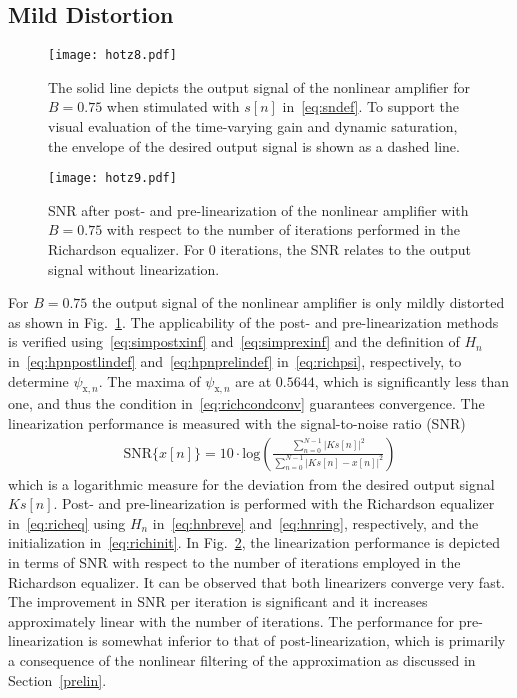 \documentclass[10pt,twocolumn,twoside]{IEEEtran}
\renewcommand{\log}[1]{\ensuremath{\text{log}\!\left(#1\right)}}		\newcommand{\abs}[1]{\ensuremath{\lvert#1\rvert}}										\newcommand{\norm}[1]{\ensuremath{\lVert#1\rVert}}									\newcommand{\norminf}[1]{\ensuremath{\lVert#1\rVert_\infty}}				\newcommand{\normone}[1]{\ensuremath{\lVert#1\rVert_1}}							\newcommand{\vm}[1]{\ensuremath{\bm{\mathrm{#1}}}}									\newcommand{\mc}[1]{\ensuremath{\mathcal{#1}}}											\newcommand{\trans}{\ensuremath{\mathsf{T}}}												\newcommand{\Z}{\ensuremath{\mathds{Z}}}														\newcommand{\C}{\ensuremath{\mathbb{C}}}														\newcommand{\sg}[2]{\ensuremath{g_{\mathrm{#1},#2}}}								\newcommand{\sw}[1]{\ensuremath{w_{\mathrm{#1}}}}										\newcommand{\swtilde}[1]{\ensuremath{\tilde{w}_{\mathrm{#1}}}}			\newcommand{\spsi}[2]{\ensuremath{\psi_{\mathrm{#1},#2}}}						\newcommand{\seta}[2]{\ensuremath{\eta_{\mathrm{#1},#2}}}						\newcommand{\setatilde}[2]{\ensuremath{\tilde{\eta}_{\mathrm{#1},#2}}}   \newcommand{\salpha}[2]{\ensuremath{\alpha_{\mathrm{#1},#2}}}				\newcommand{\sbeta}[2]{\ensuremath{\beta_{\mathrm{#1},#2}}}					\newcommand{\sgamma}[2]{\ensuremath{\gamma_{\mathrm{#1},#2}}}
\begin{document}
\subsection{Mild Distortion}
	\label{results:mild}

\begin{figure}[!t]\centering \texttt{[image: hotz8.pdf]}\caption{The solid line depicts the output signal of the nonlinear
	amplifier for $B=0.75$ when stimulated with $s[n]$ in~\eqref{eq:sndef}. To support the
	visual evaluation of the time-varying gain and dynamic saturation,
	the envelope of the desired output signal is shown as a dashed line.}\label{fig:inoutcmpb075}\end{figure}\begin{figure}[!t]\centering \texttt{[image: hotz9.pdf]}\caption{SNR after post- and pre-linearization of the nonlinear amplifier with $B=0.75$
	with respect to the number of iterations performed in the Richardson equalizer.
	For $0$ iterations, the SNR relates to the output signal without linearization.}\label{fig:snrb075}\end{figure}


For $B=0.75$ the output signal of the nonlinear amplifier is only
mildly distorted as shown in Fig.~\ref{fig:inoutcmpb075}. The applicability
of the post- and pre-linearization methods is verified
using~\eqref{eq:simpostxinf} and~\eqref{eq:simprexinf} and the definition
of $H_n$ in~\eqref{eq:hpnpostlindef} and~\eqref{eq:hpnprelindef}
in~\eqref{eq:richpsi}, respectively, to determine $\spsi{x}{n}$.
The maxima of $\spsi{x}{n}$ are at $0.5644$, which is significantly less
than one, and thus the condition in~\eqref{eq:richcondconv} guarantees convergence.
The linearization performance is measured with the signal-to-noise ratio (SNR)
\begin{align*}
	\text{SNR}\{x[n]\} = 10\cdot\log{\frac{\sum_{n=0}^{N-1}
		\abs{K s[n]}^2}{\sum_{n=0}^{N-1} \abs{K s[n] - x[n]}^2}}
\end{align*}
which is a logarithmic measure for the deviation from the desired output signal $K s[n]$. 
Post- and pre-linearization is performed with the Richardson equalizer in~\eqref{eq:richeq}
using $H_n$ in~\eqref{eq:hnbreve} and~\eqref{eq:hnring}, respectively, and the initialization
in~\eqref{eq:richinit}. In Fig.~\ref{fig:snrb075}, the linearization performance is depicted
in terms of SNR with respect to the number of iterations employed in the Richardson
equalizer. It can be observed that both linearizers converge very fast. The improvement in
SNR per iteration is significant and it increases approximately linear with the number of
iterations. The performance for pre-linearization is somewhat inferior to that of
post-linearization, which is primarily a consequence of the nonlinear filtering of the
approximation as discussed in Section~\ref{prelin}.
\end{document}
